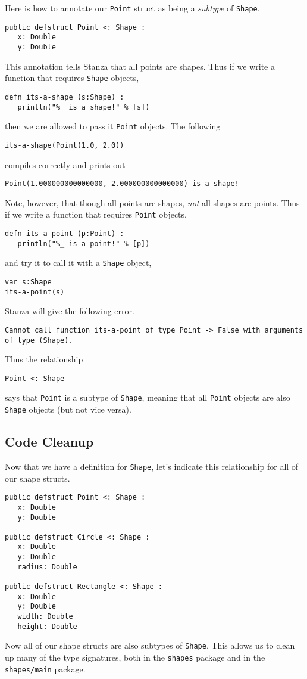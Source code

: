 \documentclass[10pt,oneside]{book}
\begin{document}
Here is how to annotate our \texttt{\frenchspacing Point} struct as being a {\em subtype} of \texttt{\frenchspacing Shape}.
\begin{lstlisting}
public defstruct Point <: Shape :
   x: Double
   y: Double
\end{lstlisting}
This annotation tells Stanza that all points are shapes. Thus if we write a function that requires \texttt{\frenchspacing Shape} objects,
\begin{lstlisting}
defn its-a-shape (s:Shape) :
   println("%_ is a shape!" % [s])
\end{lstlisting}
then we are allowed to pass it \texttt{\frenchspacing Point} objects. The following
\begin{lstlisting}
its-a-shape(Point(1.0, 2.0))
\end{lstlisting}
compiles correctly and prints out
\begin{lstlisting}
Point(1.000000000000000, 2.000000000000000) is a shape!
\end{lstlisting}

Note, however, that though all points are shapes, {\em not} all shapes are points. Thus if we write a function that requires \texttt{\frenchspacing Point} objects,
\begin{lstlisting}
defn its-a-point (p:Point) :
   println("%_ is a point!" % [p])
\end{lstlisting}
and try it to call it with a \texttt{\frenchspacing Shape} object,
\begin{lstlisting}
var s:Shape
its-a-point(s)
\end{lstlisting}
Stanza will give the following error.
\begin{lstlisting}
Cannot call function its-a-point of type Point -> False with arguments
of type (Shape).
\end{lstlisting}

Thus the relationship
\begin{lstlisting}
Point <: Shape
\end{lstlisting}
says that \texttt{\frenchspacing Point} is a subtype of \texttt{\frenchspacing Shape}, meaning that all \texttt{\frenchspacing Point} objects are also \texttt{\frenchspacing Shape} objects (but not vice versa). 

\subsection*{Code Cleanup}
Now that we have a definition for \texttt{\frenchspacing Shape}, let's indicate this relationship for all of our shape structs.
\begin{lstlisting}
public defstruct Point <: Shape :
   x: Double
   y: Double

public defstruct Circle <: Shape :
   x: Double
   y: Double
   radius: Double

public defstruct Rectangle <: Shape :
   x: Double
   y: Double
   width: Double
   height: Double
\end{lstlisting}
Now all of our shape structs are also subtypes of \texttt{\frenchspacing Shape}. This allows us to clean up many of the type signatures, both in the \texttt{\frenchspacing shapes} package and in the \texttt{\frenchspacing shapes/main} package.
\end{document}
